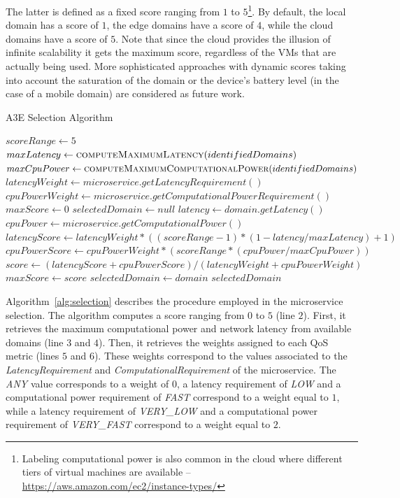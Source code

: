 The latter is defined as a fixed score ranging from $1$ to $5$\footnote{Labeling computational power is also common in the cloud where different tiers of virtual machines are available -- \url{https://aws.amazon.com/ec2/instance-types/}}. By default, the local domain has a score of $1$, the edge domains have a score of $4$, while the cloud domains have a score of $5$. Note that since the cloud provides the illusion of infinite scalability it gets the maximum score, regardless of the VMs that are actually being used. More sophisticated approaches with dynamic scores taking into account the saturation of the domain or the device's battery level (in the case of a mobile domain) are considered as future work.

\begin{algorithm}[thb]
	\caption{A3E Selection Algorithm}
	\label{alg:selection}
	\begin{algorithmic}[1]
		
		\State$scoreRange \gets 5$
		\State $maxLatency \gets \Call{computeMaximumLatency}{identifiedDomains}$
		\State $maxCpuPower \gets \Call{computeMaximumComputationalPower}{identifiedDomains}$
		\State $latencyWeight \gets microservice.getLatencyRequirement()$ 
		\State $cpuPowerWeight \gets microservice.getComputationalPowerRequirement()$ 
		\State $maxScore \gets 0$
		\State $selectedDomain \gets null$
		\State $latency \gets domain.getLatency()$ 
		\State $cpuPower \gets microservice.getComputationalPower()$ 
		\State $latencyScore \gets latencyWeight*((scoreRange-1)*(1 - latency/maxLatency)+1)$ 
		\State $cpuPowerScore \gets cpuPowerWeight*(scoreRange*(cpuPower/maxCpuPower))$
		\State $score \gets (latencyScore + cpuPowerScore) / (latencyWeight + cpuPowerWeight)$
		\State $maxScore \gets score$
		\State $selectedDomain \gets domain$
		\EndIf
		\EndFor 
		\State \Return $selectedDomain$
		\EndFunction
	\end{algorithmic}
\end{algorithm}

Algorithm~\ref{alg:selection} describes the procedure employed in the microservice selection. The algorithm computes a score ranging from $0$ to $5$ (line $2$). First, it retrieves the maximum computational power and network latency from available domains (line $3$ and $4$). Then, it retrieves the weights assigned to each QoS metric (lines $5$ and $6$). These weights correspond to the values associated to the \textit{LatencyRequirement} and \textit{ComputationalRequirement} of the microservice. The \textit{ANY} value corresponds to a weight of $0$, a latency requirement of \textit{LOW} and a computational power requirement of \textit{FAST} correspond to a weight equal to $1$, while a latency requirement of \textit{VERY\_LOW} and a computational power requirement of \textit{VERY\_FAST} correspond to a weight equal to $2$. 

